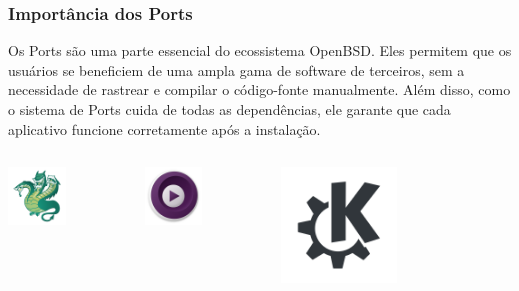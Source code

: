 \documentclass[9pt,xcolor=table]{beamer}
\begin{document}
\begin{frame}
\frametitle{Importância dos Ports}
\justifying
Os Ports são uma parte essencial do ecossistema OpenBSD. Eles permitem que os usuários se beneficiem de uma ampla gama de software de terceiros, sem a necessidade de rastrear e compilar o código-fonte manualmente. Além disso, como o sistema de Ports cuida de todas as dependências, ele garante que cada aplicativo funcione corretamente após a instalação.
\vspace{0.5cm}
\begin{columns}
\begin{column}{0.3\textwidth}
\centering
\includegraphics[width=0.5\textwidth]{imagens/hydra-logo.png}
\end{column}
\begin{column}{0.3\textwidth}
\centering
\includegraphics[width=0.5\textwidth]{imagens/mpv-logo.png}
\end{column}
\begin{column}{0.3\textwidth}
\centering
\includegraphics[width=0.5\textwidth]{imagens/kde-logo.png}
\end{column}
\end{columns}
\end{frame}
\end{document}
